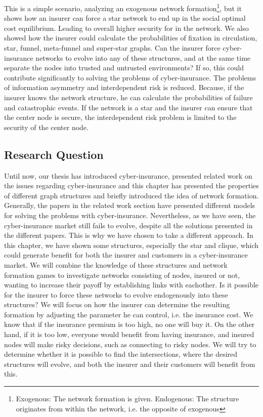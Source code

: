 This is a simple scenario, analyzing an exogenous network formation\footnote{Exogenous: The network formation is given. Endogenous: The structure originates from within the network, i.e. the opposite of exogenous}, but it shows how an insurer can force a star network to end up in the social optimal cost equilibrium. Leading to overall higher security for in the network. We also showed how the insurer could calculate the probabilities of fixation in circulation, star, funnel, meta-funnel and super-star graphs.  Can the insurer force cyber-insurance networks to evolve into any of these structures, and at the same time separate the nodes into trusted and untrusted environments? 
If so, this could contribute significantly to solving the problems of cyber-insurance. The problems of information asymmetry and interdependent risk is reduced. Because, if the insurer knows the network structure, he can calculate the probabilities of failure and catastrophic events. If the network is a star and the insurer can ensure that the center node is secure, the interdependent risk problem is limited to the security of the center node.



\subsection{Research Question}

Until now, our thesis has introduced cyber-insurance, presented related work on the issues regarding cyber-insurance and this chapter has presented the properties of different graph structures and briefly introduced the idea of network formation. Generally, the papers in the related work section have presented different models for solving the problems with cyber-insurance. Nevertheless, as we have seen, the cyber-insurance market still fails to evolve, despite all the solutions presented in the different papers. This is why we have chosen to take a different approach.
In this chapter, we have shown some structures, especially the star and clique, which could generate benefit for both the insurer and customers in a cyber-insurance market. 
We will combine the knowledge of these structures and network formation games to investigate networks consisting of nodes, insured or not, wanting to increase their payoff by establishing links with eachother. Is it possible for the insurer to force these networks to evolve endogenously into these structures?
We will focus on how the insurer can determine the resulting formation by adjusting the parameter he can control, i.e. the insurance cost. We know that if the insurance premium is too high, no one will buy it. On the other hand, if it is too low, everyone would benefit from having insurance, and insured nodes will make risky decisions, such as connecting to risky nodes. We will try to determine whether it is possible to find the intersections, where the desired structures will evolve, and both the insurer and their customers will benefit from this.
